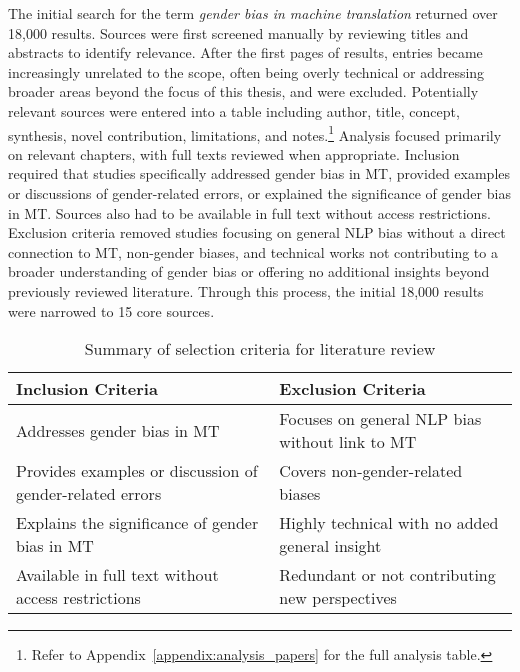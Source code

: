         The initial search for the term \textit{gender bias in machine translation} returned over 18,000 results. Sources were first screened manually by reviewing titles and abstracts to identify relevance. After the first pages of results, entries became increasingly unrelated to the scope, often being overly technical or addressing broader areas beyond the focus of this thesis, and were excluded. Potentially relevant sources were entered into a table including author, title, concept, synthesis, novel contribution, limitations, and notes.\footnote{Refer to Appendix~\ref{appendix:analysis_papers} for the full analysis table.} Analysis focused primarily on relevant chapters, with full texts reviewed when appropriate. Inclusion required that studies specifically addressed gender bias in MT, provided examples or discussions of gender-related errors, or explained the significance of gender bias in MT. Sources also had to be available in full text without access restrictions. Exclusion criteria removed studies focusing on general NLP bias without a direct connection to MT, non-gender biases, and technical works not contributing to a broader understanding of gender bias or offering no additional insights beyond previously reviewed literature. Through this process, the initial 18,000 results were narrowed to 15 core sources. 

        \vspace{0.8em}
        \begin{table}[h]
            \centering
            \begin{tabularx}{\textwidth}{X X}
            \toprule
            \textbf{Inclusion Criteria} & \textbf{Exclusion Criteria} \\
            \midrule
            Addresses gender bias in MT & Focuses on general NLP bias without link to MT \\
            Provides examples or discussion of gender-related errors & Covers non-gender-related biases \\
            Explains the significance of gender bias in MT & Highly technical with no added general insight \\
            Available in full text without access restrictions & Redundant or not contributing new perspectives \\
            \bottomrule
            \end{tabularx}
            \caption{Summary of selection criteria for literature review}
        \end{table}

